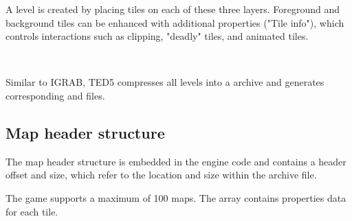 \documentclass[book.tex]{subfiles}
\begin{document}
A level is created by placing tiles on each of these three layers. Foreground and background tiles can be enhanced with additional properties ("Tile info"), which controls interactions such as clipping, "deadly" tiles, and animated tiles. \\

\par
{}\\
 
\par
Similar to IGRAB, TED5 compresses all levels into a  archive and generates corresponding  and  files.\\

 
\subsection{Map header structure}
The map header structure is embedded in the engine code and contains a header offset and size, which refer to the location and size within the  archive file. \\

\par
\begin{minipage}{\textwidth}
 \par
 \end{minipage}

The game supports a maximum of 100 maps. The  array contains properties data for each tile.
 
\end{document}
